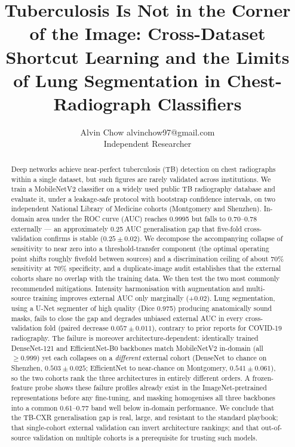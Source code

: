 \documentclass{article}
\title{Tuberculosis Is Not in the Corner of the Image: Cross-Dataset Shortcut
Learning and the Limits of Lung Segmentation in Chest-Radiograph Classifiers}
\author{\name Alvin Chow \email alvinchow97@gmail.com \\
        \addr Independent Researcher}
\begin{document}
\maketitle

\begin{abstract}
Deep networks achieve near-perfect tuberculosis (TB) detection on chest radiographs within a single
dataset, but such figures are rarely validated across institutions. We train a MobileNetV2
classifier on a widely used public TB radiography database and evaluate it, under a leakage-safe
protocol with bootstrap confidence intervals, on two independent National Library of Medicine
cohorts (Montgomery and Shenzhen). In-domain area under the ROC curve (AUC) reaches 0.9995 but
falls to 0.70--0.78 externally --- an approximately 0.25 AUC generalisation gap that five-fold
cross-validation confirms is stable ($0.25 \pm 0.02$). We decompose the accompanying collapse of
sensitivity to near zero into a threshold-transfer component (the optimal operating point shifts
roughly fivefold between sources) and a discrimination ceiling of about 70\% sensitivity at 70\%
specificity, and a duplicate-image audit establishes that the external cohorts share no overlap
with the training data. We then test the two most commonly recommended mitigations. Intensity
harmonisation with augmentation and multi-source training improves external AUC only marginally
($+0.02$). Lung segmentation, using a U-Net segmenter of high quality (Dice 0.975) producing
anatomically sound masks, fails to close the gap and degrades unbiased external AUC in every
cross-validation fold (paired decrease $0.057 \pm 0.011$), contrary to prior reports for COVID-19
radiography. The failure is moreover architecture-dependent: identically trained DenseNet-121 and
EfficientNet-B0 backbones match MobileNetV2 in-domain (all $\geq 0.999$) yet each collapses on a
\emph{different} external cohort (DenseNet to chance on Shenzhen, $0.503 \pm 0.025$; EfficientNet
to near-chance on Montgomery, $0.541 \pm 0.061$), so the two cohorts rank the three architectures
in entirely different orders. A frozen-feature probe shows these failure profiles already exist in
the ImageNet-pretrained representations before any fine-tuning, and masking homogenises all three
backbones into a common 0.61--0.77 band well below in-domain performance. We conclude that the
TB-CXR generalisation gap is real, large, and resistant to the standard playbook; that
single-cohort external validation can invert architecture rankings; and that out-of-source
validation on multiple cohorts is a prerequisite for trusting such models.
\end{abstract}
\end{document}

